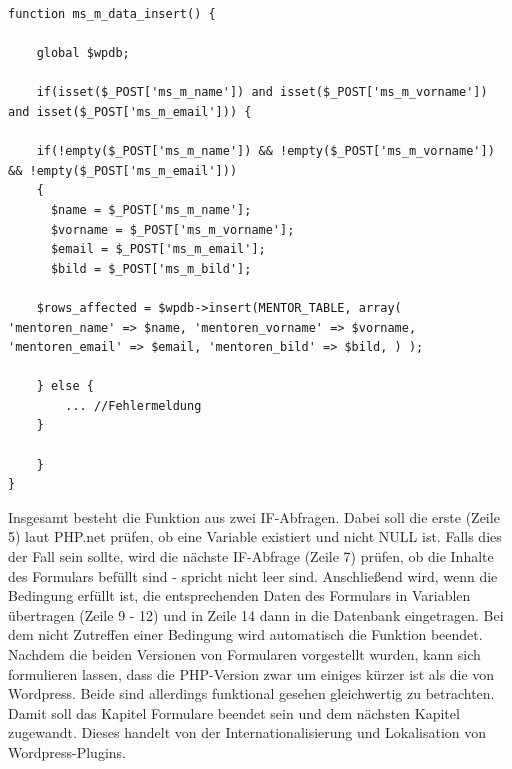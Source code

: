 \begin{lstlisting}
function ms_m_data_insert() {

	global $wpdb;

	if(isset($_POST['ms_m_name']) and isset($_POST['ms_m_vorname']) and isset($_POST['ms_m_email'])) {

	if(!empty($_POST['ms_m_name']) && !empty($_POST['ms_m_vorname']) && !empty($_POST['ms_m_email']))
	{		
	  $name = $_POST['ms_m_name']; 
	  $vorname = $_POST['ms_m_vorname']; 
	  $email = $_POST['ms_m_email'];
	  $bild = $_POST['ms_m_bild'];
	
	$rows_affected = $wpdb->insert(MENTOR_TABLE, array( 'mentoren_name' => $name, 'mentoren_vorname' => $vorname, 'mentoren_email' => $email, 'mentoren_bild' => $bild, ) );
	
	} else {
		... //Fehlermeldung
	}

	}
}
\end{lstlisting}
Insgesamt besteht die Funktion aus zwei IF-Abfragen. Dabei soll die erste (Zeile 5) laut PHP.net prüfen, ob eine Variable existiert und nicht NULL ist. Falls dies der Fall sein sollte, wird die nächste IF-Abfrage (Zeile 7) prüfen, ob die Inhalte des Formulars befüllt sind - spricht nicht leer sind. Anschließend wird, wenn die Bedingung erfüllt ist, die entsprechenden Daten des Formulars in Variablen übertragen (Zeile 9 - 12) und in Zeile 14 dann in die Datenbank eingetragen. Bei dem nicht Zutreffen einer Bedingung wird automatisch die Funktion beendet.\newline
Nachdem die beiden Versionen von Formularen vorgestellt wurden, kann sich formulieren lassen, dass die PHP-Version zwar um einiges kürzer ist als die von Wordpress. Beide sind allerdings funktional gesehen gleichwertig zu betrachten.\newline
Damit soll das Kapitel Formulare beendet sein und dem nächsten Kapitel zugewandt. Dieses handelt von der Internationalisierung und Lokalisation von Wordpress-Plugins.